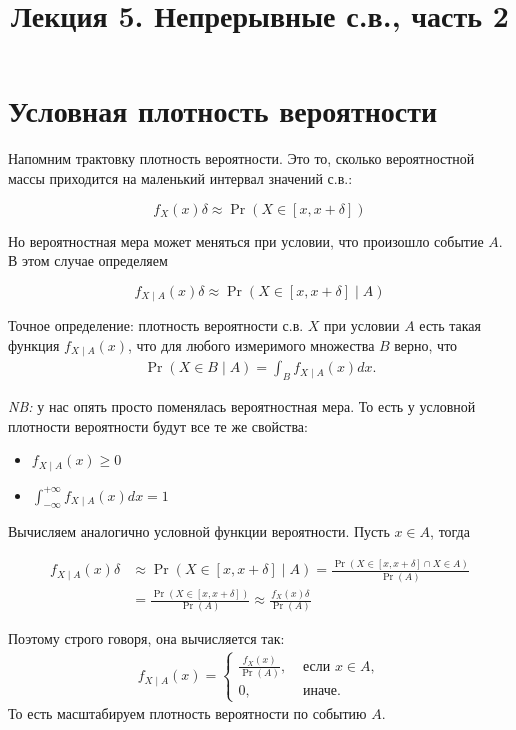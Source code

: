 \documentclass[12pt]{article}
\title{Лекция 5. Непрерывные с.в., часть 2}
\begin{document}
\maketitle


\section{Условная плотность вероятности}

Напомним трактовку плотность вероятности. Это то, сколько вероятностной массы приходится на маленький интервал значений с.в.:

\[f_X(x) \delta \approx \Pr(X \in [x, x + \delta])\]

Но вероятностная мера может меняться при условии, что произошло событие $A$. В этом случае определяем

\[f_{X\mid A} (x) \delta \approx \Pr(X \in [x, x + \delta] \mid A)\]

Точное определение: плотность вероятности с.в. $X$ при условии $A$ есть такая функция $f_{X \mid A}(x)$, что для любого измеримого множества $B$ верно, что
\begin{align*}
  \Pr(X \in B \mid A) = \int_B f_{X \mid A}(x) dx.
\end{align*}

\emph{NB:} у нас опять просто поменялась вероятностная мера. То есть у условной плотности вероятности будут все те же свойства:
\begin{itemize}
  \item $f_{X \mid A}(x) \ge 0$
  \item $\int_{-\infty}^{+\infty} f_{X \mid A} (x) dx = 1$
 \end{itemize}

 Вычисляем аналогично условной функции вероятности. Пусть $x \in A$, тогда

 \begin{align*}
  f_{X\mid A} (x) \delta &\approx \Pr(X \in [x, x + \delta] \mid A) = \frac{\Pr(X \in [x, x + \delta] \cap X \in A)}{\Pr(A)} \\
  &= \frac{\Pr(X \in [x, x + \delta])}{\Pr(A)} \approx \frac{f_X(x) \delta}{\Pr(A)}
 \end{align*}

 Поэтому строго говоря, она вычисляется так:
 \begin{align*}
   f_{X\mid A}(x) = \begin{cases}
     \frac{f_X(x)}{\Pr(A)}, &\text{ если } x \in A, \\
     0, &\text{ иначе.}
   \end{cases}
 \end{align*}
 То есть масштабируем плотность вероятности по событию $A$.
\end{document}
